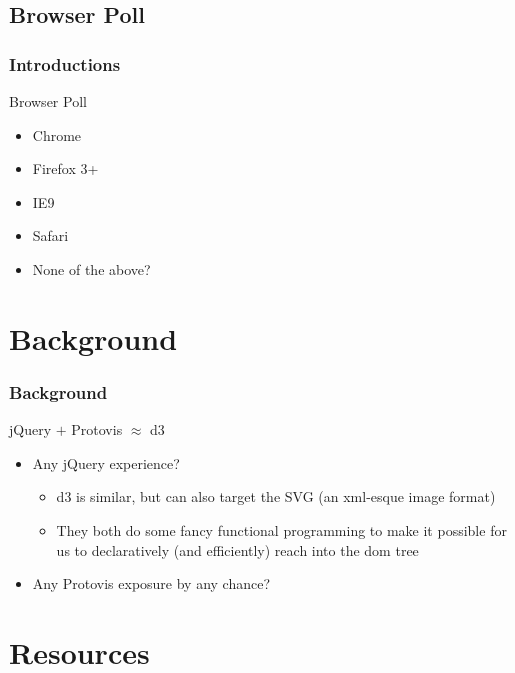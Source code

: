 \documentclass{beamer}
\begin{document}
\subsection{Browser Poll}

\begin{frame}
    \frametitle{Introductions}
\pause
    \begin{block}{Browser Poll}
        \begin{itemize}
\pause
        \item Chrome
\pause
        \item Firefox 3+
\pause
        \item IE9
\pause
        \item Safari
\pause
        \item None of the above?
        \end{itemize}
    \end{block}
\end{frame}


\section{Background}

\begin{frame}
    \frametitle{Background}
    \begin{block}{jQuery $+$ Protovis $\approx$ d3}
\pause
        \begin{itemize}
        \item Any jQuery experience?
\pause
            \begin{itemize}
            \item d3 is similar, but can also target the SVG (an xml-esque image format)
\pause
            \item They both do some fancy functional programming to make it possible 
                  for us to declaratively (and efficiently) reach into the dom tree
            \end{itemize}
\pause
       \item Any Protovis exposure by any chance?
       \end{itemize}
    \end{block}
\end{frame}



\section{Resources}
\end{document}
